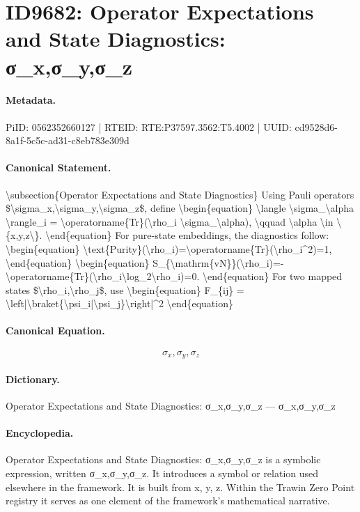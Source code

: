 \section*{ID9682: Operator Expectations and State Diagnostics: σ\_x,σ\_y,σ\_z}
\paragraph{Metadata.}
PiID: 0562352660127 | RTEID: RTE:P37597.3562:T5.4002 | UUID: cd9528d6-8a1f-5c5c-ad31-c8eb783e309d

\paragraph{Canonical Statement.}
\textbackslash{}subsection\{Operator Expectations and State Diagnostics\} Using Pauli operators \$\textbackslash{}sigma\_x,\textbackslash{}sigma\_y,\textbackslash{}sigma\_z\$, define \textbackslash{}begin\{equation\} \textbackslash{}langle \textbackslash{}sigma\_\textbackslash{}alpha \textbackslash{}rangle\_i = \textbackslash{}operatorname\{Tr\}(\textbackslash{}rho\_i \textbackslash{}sigma\_\textbackslash{}alpha), \textbackslash{}qquad \textbackslash{}alpha \textbackslash{}in \textbackslash{}\{x,y,z\textbackslash{}\}. \textbackslash{}end\{equation\} For pure-state embeddings, the diagnostics follow: \textbackslash{}begin\{equation\} \textbackslash{}text\{Purity\}(\textbackslash{}rho\_i)=\textbackslash{}operatorname\{Tr\}(\textbackslash{}rho\_i\textasciicircum{}2)=1, \textbackslash{}end\{equation\} \textbackslash{}begin\{equation\} S\_\{\textbackslash{}mathrm\{vN\}\}(\textbackslash{}rho\_i)=-\textbackslash{}operatorname\{Tr\}(\textbackslash{}rho\_i\textbackslash{}log\_2\textbackslash{}rho\_i)=0. \textbackslash{}end\{equation\} For two mapped states \$\textbackslash{}rho\_i,\textbackslash{}rho\_j\$, use \textbackslash{}begin\{equation\} F\_\{ij\} = \textbackslash{}left|\textbackslash{}braket\{\textbackslash{}psi\_i|\textbackslash{}psi\_j\}\textbackslash{}right|\textasciicircum{}2 \textbackslash{}end\{equation\}

\paragraph{Canonical Equation.}
\[
\sigma_x,\sigma_y,\sigma_z
\]

\paragraph{Dictionary.}
Operator Expectations and State Diagnostics: σ\_x,σ\_y,σ\_z — σ\_x,σ\_y,σ\_z

\paragraph{Encyclopedia.}
Operator Expectations and State Diagnostics: σ\_x,σ\_y,σ\_z is a symbolic expression, written σ\_x,σ\_y,σ\_z. It introduces a symbol or relation used elsewhere in the framework. It is built from x, y, z. Within the Trawin Zero Point registry it serves as one element of the framework's mathematical narrative.
